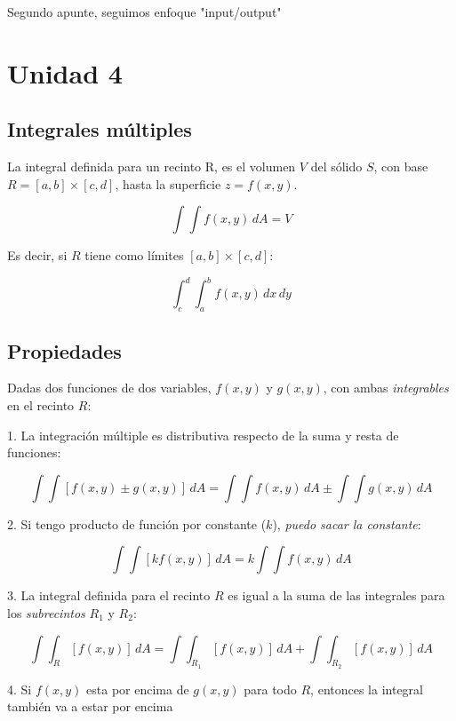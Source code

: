 Segundo apunte, seguimos enfoque "input/output"

\section{Unidad 4}

\subsection{Integrales múltiples}

La integral definida para un recinto R,
es el volumen \(V\) del sólido \(S\), 
con base \(R = [a,b] \times [c,d]\),
hasta la superficie \(z = f(x,y)\).

\begin{equation*}
    \int\int f(x,y)\,dA = V
\end{equation*}

Es decir, si \(R\) tiene como límites \([a,b] \times [c,d]\):

\begin{equation*}
    \int_{c}^{d}\int_{a}^{b} f(x,y) \,dx\,dy
\end{equation*}

\subsection{Propiedades}

Dadas dos funciones de dos variables,
\(f(x,y)\) y \(g(x,y)\),
con ambas \textit{integrables} en el recinto \(R\):

1. La integración múltiple es distributiva respecto de la suma y resta de funciones: 

\begin{equation*}
    \int\int [f(x,y) \pm g(x,y)] \,dA = \int\int f(x,y) \,dA \pm \int\int g(x,y) \,dA
\end{equation*}

2. Si tengo producto de función por constante (\(k\)), \textit{puedo sacar la constante}:

\begin{equation*}
    \int\int [kf(x,y)] \,dA = k \int\int f(x,y) \,dA
\end{equation*}

3. La integral definida para el recinto \(R\) es igual a la suma de las integrales para los \textit{subrecintos} \(R_1\) y \(R_2\):

\begin{equation*}
    \int\int_R [f(x,y)] \,dA = \int\int_{R_1} [f(x,y)] \,dA + \int\int_{R_2} [f(x,y)] \,dA
\end{equation*}

4. Si \(f(x,y)\) esta por encima de \(g(x,y)\) para todo \(R\), entonces la integral también va a estar por encima 
